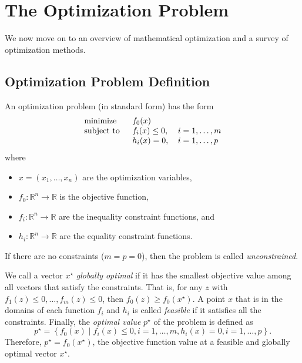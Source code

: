 \section{The Optimization Problem}
We now move on to an overview of mathematical optimization and a survey of optimization methods.
\subsection{Optimization Problem Definition}
\begin{defn}
	An optimization problem (in standard form) has the form
	\begin{equation}
		\begin{tabular}{lll}
			\text{minimize }   & $f_0(x)$        &                 \\
			\text{subject to } & $f_i(x)\leq 0$, & $i=1,\ldots, m$ \\
			& $h_i(x) = 0$,   & $i=1,\ldots, p$ 
		\end{tabular}\label{Optimization}
	\end{equation}
	where
	\begin{itemize}
		\item $x=\left(x_1,\ldots,x_n\right)$ are the optimization variables,
		\item $f_0 : \mathbb{R}^n\rightarrow\mathbb{R}$ is the objective function,
		\item $f_i : \mathbb{R}^n\rightarrow\mathbb{R}$ are the inequality constraint functions, and
		\item $h_i : \mathbb{R}^n\rightarrow\mathbb{R}$ are the equality constraint functions.
	\end{itemize}
\end{defn}
If there are no constraints ($m=p=0$), then the problem is called \textit{unconstrained}. \cite[p. 127]{Boyd2004}

We call a vector $x^\star$ \textit{globally optimal} if it has the smallest objective value among all vectors that satisfy the constraints. That is, for any $z$ with $f_1(z)\leq 0,\ldots, f_m(z)\leq 0$, then $f_0(z)\geq f_0(x^\star)$. A point $x$ that is in the domains of each function $f_i$ and $h_i$ is called \textit{feasible} if it satisfies all the constraints. Finally, the \textit{optimal value} $p^\star$ of the problem is defined as $$p^\star=\left\lbrace f_0(x) \mid f_i(x)\leq 0, i=1,\ldots,m, h_i(x)=0, i=1,\ldots,p\right\rbrace.$$ Therefore, $p^{\star}=f_0(x^\star)$, the objective function value at a feasible and globally optimal vector $x^{\star}$.

